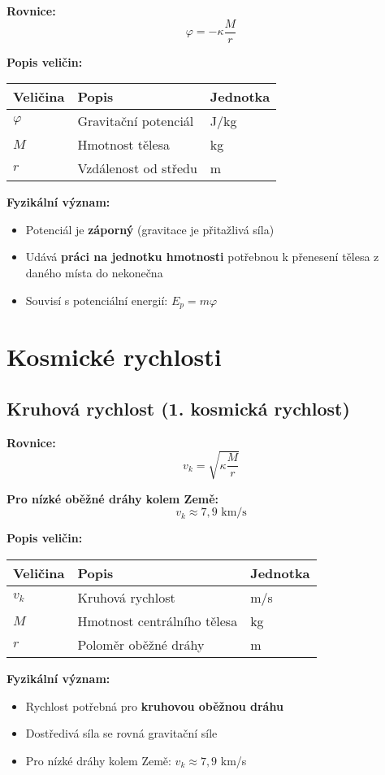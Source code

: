 \documentclass[11pt,a4paper]{article}
\begin{document}
\textbf{Rovnice:}
\[\varphi = -\kappa \frac{M}{r}\]

\textbf{Popis veličin:}

\begin{longtable}{lll}
\toprule
Veličina & Popis & Jednotka \\
\midrule
$\varphi$ & Gravitační potenciál & J/kg \\
$M$ & Hmotnost tělesa & kg \\
$r$ & Vzdálenost od středu & m \\
\bottomrule
\end{longtable}

\textbf{Fyzikální význam:}

\begin{itemize}
\item Potenciál je \textbf{záporný} (gravitace je přitažlivá síla)
\item Udává \textbf{práci na jednotku hmotnosti} potřebnou k přenesení tělesa z daného místa do nekonečna
\item Souvisí s potenciální energií: $E_p = m\varphi$
\end{itemize}

\clearpage

\section{Kosmické rychlosti}

\subsection{Kruhová rychlost (1. kosmická rychlost)}

\textbf{Rovnice:}
\[v_k = \sqrt{\kappa \frac{M}{r}}\]

\textbf{Pro nízké oběžné dráhy kolem Země:}
\[v_k \approx 7{,}9 \text{ km/s}\]

\textbf{Popis veličin:}

\begin{longtable}{lll}
\toprule
Veličina & Popis & Jednotka \\
\midrule
$v_k$ & Kruhová rychlost & m/s \\
$M$ & Hmotnost centrálního tělesa & kg \\
$r$ & Poloměr oběžné dráhy & m \\
\bottomrule
\end{longtable}

\textbf{Fyzikální význam:}

\begin{itemize}
\item Rychlost potřebná pro \textbf{kruhovou oběžnou dráhu}
\item Dostředivá síla se rovná gravitační síle
\item Pro nízké dráhy kolem Země: $v_k \approx 7{,}9$ km/s
\end{itemize}
\end{document}

